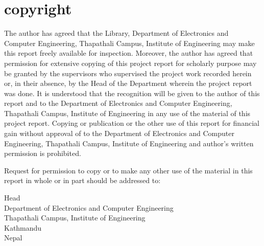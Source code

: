 \chapter*{copyright}

The author has agreed that the Library, Department of Electronics and Computer Engineering, Thapathali Campus, Institute of Engineering may make this report freely available for inspection. Moreover, the author has agreed that permission for extensive copying of this project report for scholarly purpose may be granted by the supervisors who supervised the project work recorded herein or, in their absence, by the Head of the Department wherein the project report was done. It is understood that the recognition will be given to the author of this report and to the Department of Electronics and Computer Engineering, Thapathali Campus, Institute of Engineering in any use of the material of this project report. Copying or publication or the other use of this report for financial gain without approval of to the Department of Electronics and Computer Engineering, Thapathali Campus, Institute of Engineering and author’s written permission is prohibited. 

Request for permission to copy or to make any other use of the material in this report in whole or in part should be addressed to: 

\noindent Head\\
Department of Electronics and Computer Engineering\\
Thapathali Campus, Institute of Engineering \\
Kathmandu\\
Nepal\\

\newpage

